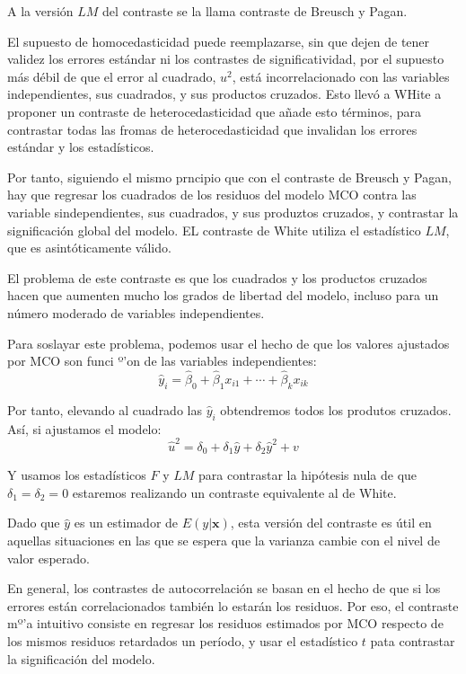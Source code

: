 A la versi\'on $LM$ del contraste se la llama contraste de Breusch y Pagan.


El supuesto de homocedasticidad puede reemplazarse, sin que dejen de tener validez los errores est\'andar ni los contrastes de significatividad, por el supuesto m\'as d\'ebil de que el error al cuadrado, $u^2$, est\'a incorrelacionado con las variables independientes, sus cuadrados, y sus productos cruzados. Esto llev\'o a WHite a proponer un contraste de heterocedasticidad que a\~nade esto t\'erminos, para contrastar todas las fromas de heterocedasticidad que invalidan los errores est\'andar y los estad\'isticos.

Por tanto, siguiendo el mismo prncipio que con el contraste de Breusch y Pagan, hay que regresar los cuadrados de los residuos del modelo MCO contra las variable sindependientes, sus cuadrados, y sus produztos cruzados, y contrastar la significaci\'on global del modelo. EL contraste de White utiliza el estad\'istico $LM$, que es asint\'oticamente v\'alido.

El problema de este contraste es que los cuadrados y los productos cruzados hacen que aumenten mucho los grados de libertad del modelo, incluso para un n\'umero moderado de variables independientes.

Para soslayar este problema, podemos usar el hecho de que los valores ajustados por MCO son funci º'on de las variables independientes:
\[\hat{y}_i=\hat{\beta}_0+\hat{\beta}_1x_{i1}+\cdots+\hat{\beta}_kx_{ik}\]

Por tanto, elevando al cuadrado las $\hat{y}_i$ obtendremos todos los produtos cruzados. As\'i, si ajustamos el modelo:
\[\hat{u}^2=\delta_0+\delta_1\hat{y}+\delta_2\hat{y}^2+v\]

Y usamos los estad\'isticos $F$ y $LM$ para contrastar la hip\'otesis nula de que $\delta_1=\delta_2=0$ estaremos realizando un contraste equivalente al de White.

Dado que $\hat{y}$ es un estimador de $E(y|\boldsymbol{x})$, esta versi\'on del contraste es \'util en aquellas situaciones en las que se espera que la varianza cambie con el nivel de valor esperado.



En general, los contrastes de autocorrelaci\'on se basan en el hecho de que si los errores est\'an correlacionados tambi\'en lo estar\'an los residuos. Por eso, el contraste mº'a intuitivo consiste en regresar los residuos estimados por MCO respecto de los mismos residuos retardados un per\'iodo, y usar el estad\'istico $t$ pata contrastar la significaci\'on del modelo. 

